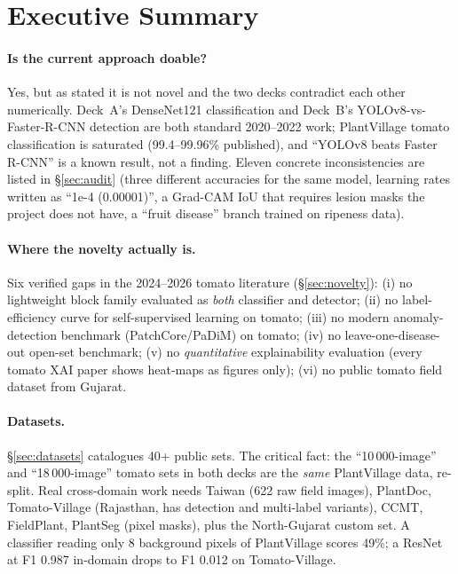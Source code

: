 \section{Executive Summary}

\paragraph{Is the current approach doable?} Yes, but as stated it is not novel and the two decks contradict each other numerically. Deck~A's DenseNet121 classification and Deck~B's YOLOv8-vs-Faster-R-CNN detection are both standard 2020--2022 work; PlantVillage tomato classification is saturated (99.4--99.96\% published), and ``YOLOv8 beats Faster R-CNN'' is a known result, not a finding. Eleven concrete inconsistencies are listed in \S\ref{sec:audit} (three different accuracies for the same model, learning rates written as ``1e-4 (0.00001)'', a Grad-CAM IoU that requires lesion masks the project does not have, a ``fruit disease'' branch trained on ripeness data).

\paragraph{Where the novelty actually is.} Six verified gaps in the 2024--2026 tomato literature (\S\ref{sec:novelty}): (i) no lightweight block family evaluated as \emph{both} classifier and detector; (ii) no label-efficiency curve for self-supervised learning on tomato; (iii) no modern anomaly-detection benchmark (PatchCore/PaDiM) on tomato; (iv) no leave-one-disease-out open-set benchmark; (v) no \emph{quantitative} explainability evaluation (every tomato XAI paper shows heat-maps as figures only); (vi) no public tomato field dataset from Gujarat.

\paragraph{Datasets.} \S\ref{sec:datasets} catalogues 40+ public sets. The critical fact: the ``10\,000-image'' and ``18\,000-image'' tomato sets in both decks are the \emph{same} PlantVillage data, re-split. Real cross-domain work needs Taiwan (622 raw field images), PlantDoc, Tomato-Village (Rajasthan, has detection and multi-label variants), CCMT, FieldPlant, PlantSeg (pixel masks), plus the North-Gujarat custom set. A classifier reading only 8 background pixels of PlantVillage scores 49\%; a ResNet at F1 0.987 in-domain drops to F1 0.012 on Tomato-Village.

